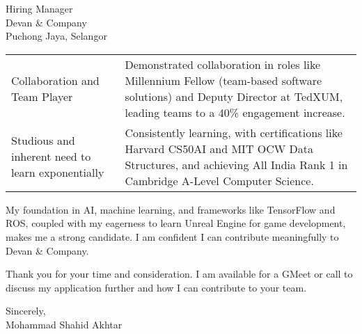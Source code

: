 \documentclass[10.5pt]{letter}
\begin{document}
\begin{letter}{Hiring Manager\\
Devan \& Company\\
Puchong Jaya, Selangor}
\begin{tabularx}{\textwidth}{@{}p{}X@{}}
Collaboration and Team Player & Demonstrated collaboration in roles like Millennium Fellow (team-based software solutions) and Deputy Director at TedXUM, leading teams to a 40\% engagement increase. \\

Studious and inherent need to learn exponentially &  Consistently learning, with certifications like Harvard CS50AI and MIT OCW Data Structures, and achieving All India Rank 1 in Cambridge A-Level Computer Science. \\

\end{tabularx}

\vspace{0.5cm}
My foundation in AI, machine learning, and frameworks like TensorFlow and ROS, coupled with my eagerness to learn Unreal Engine for game development, makes me a strong candidate. I am confident I can contribute meaningfully to Devan \& Company.

\vspace{0.3cm}
Thank you for your time and consideration. I am available for a GMeet or call to discuss my application further and how I can contribute to your team.

\vspace{0.3cm}
\begin{flushleft}
Sincerely,\\
[2ex]
Mohammad Shahid Akhtar
\end{flushleft}

\end{letter}
\end{document}
